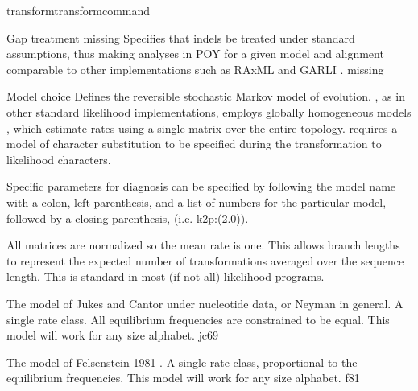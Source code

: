 \begin{command}{transform}{transformcommand}
\begin{arguments}
\begin {argumentgroup} {Gap treatment}
                         {\obligatory missing}
                            {Specifies that indels be treated under standard
                            assumptions, thus making analyses in POY for a given
                            model and alignment comparable to other
                            implementations such as RAxML \cite{stamatakis2006} and 
                            GARLI \cite{zwickl2006}.}
                            {missing}
 
   \end {argumentgroup}                         
          

\begin {argumentgroup} {Model choice}
                Defines the reversible stochastic Markov model of evolution.
                \poy, as in other standard likelihood implementations,
                employs globally homogeneous models \cite{jayaswal2005estimation}, which
                estimate rates using a single matrix over the entire topology.
                \poy requires a model of character substitution to be specified
                during the transformation to likelihood characters.

                Specific parameters for diagnosis can be specified by following
                the model name with a colon, left parenthesis, and a list of
                numbers for the particular model, followed by a closing
                parenthesis, (i.e. k2p:(2.0)).

                \begin{statement}
                    All matrices are normalized so the mean rate is one. This
                    allows branch lengths to represent the expected number of
                    transformations averaged over the sequence length. This is
                    standard in most (if not all) likelihood programs.
                \end{statement}

                        {The model of Jukes and Cantor \cite{jukesandcantor1969}
                        under nucleotide data, or Neyman \cite{neyman1971} in general. A
                        single rate class. All equilibrium frequencies are
                        constrained to be equal. This model will work for any size
                        alphabet.}
                        {jc69}

                        {The model of Felsenstein 1981 \cite{felsenstein1981}. A
                        single rate class, proportional to the equilibrium
                        frequencies. This model will work for any size
                        alphabet.}
                        {f81}


\end{argumentgroup}
\end{arguments}
\end{command}
